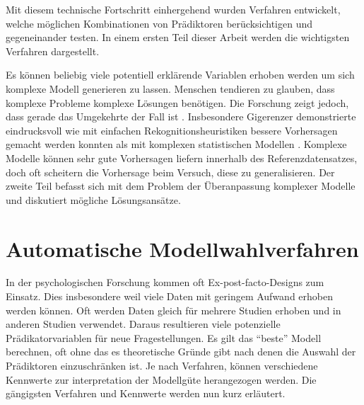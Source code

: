 \documentclass[english,12pt,doc]{apa}
\begin{document}
Mit diesem technische Fortschritt einhergehend wurden Verfahren entwickelt, welche möglichen Kombinationen von Prädiktoren berücksichtigen und gegeneinander testen. 
In einem ersten Teil dieser Arbeit werden die wichtigsten Verfahren dargestellt. 

Es können beliebig viele potentiell erklärende Variablen erhoben werden um sich komplexe Modell generieren zu lassen. 
Menschen tendieren zu glauben, dass komplexe Probleme komplexe Lösungen benötigen. 
Die Forschung zeigt jedoch, dass gerade das Umgekehrte der Fall ist \cite[p.3]{armstrong2011illusions}. 
Insbesondere Gigerenzer demonstrierte eindrucksvoll wie mit einfachen Rekognitionsheuristiken bessere Vorhersagen gemacht werden konnten als mit komplexen statistischen Modellen \cite{borges1999can}. 
Komplexe Modelle können sehr gute Vorhersagen liefern innerhalb des Referenzdatensatzes, doch oft scheitern die Vorhersage beim Versuch, diese zu generalisieren. 
Der zweite Teil befasst sich mit dem Problem der Überanpassung komplexer Modelle und diskutiert mögliche Lösungsansätze.

\section{Automatische Modellwahlverfahren}
In der psychologischen Forschung kommen oft Ex-post-facto-Designs zum Einsatz. 
Dies insbesondere weil viele Daten mit geringem Aufwand erhoben werden können. Oft werden  Daten gleich für mehrere Studien erhoben und in anderen Studien verwendet. 
Daraus resultieren viele potenzielle Prädikatorvariablen für neue Fragestellungen. 
Es gilt das ``beste'' Modell berechnen, oft ohne das es theoretische Gründe gibt nach denen die Auswahl der Prädiktoren einzuschränken ist. 
Je nach Verfahren, können verschiedene Kennwerte zur interpretation der Modellgüte herangezogen werden. 
Die gängigsten Verfahren und Kennwerte werden nun kurz erläutert.
\end{document}
